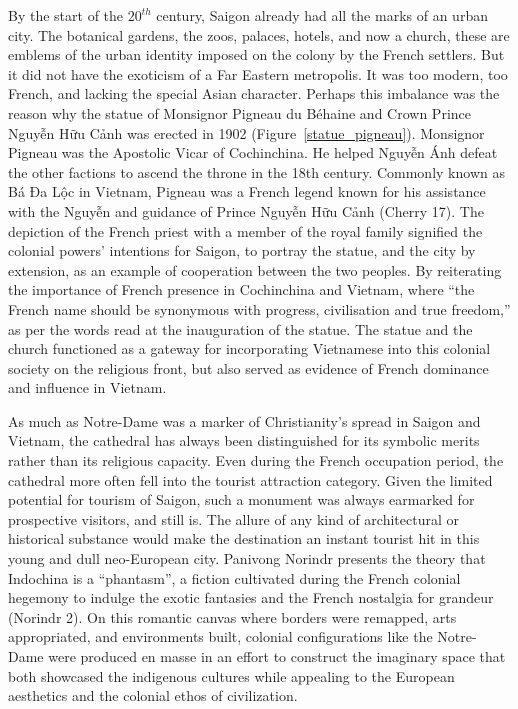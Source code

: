 \vi By the start of the $20^{th}$ century, Saigon already had all the marks of an urban city. The botanical gardens, the zoos, palaces, hotels, and now a church, these are emblems of the urban identity imposed on the colony by the French settlers. But it did not have the exoticism of a Far Eastern metropolis. It was too modern, too French, and lacking the special Asian character. Perhaps this imbalance was the reason why the statue of Monsignor Pigneau du Béhaine and Crown Prince Nguyễn Hữu Cảnh was erected in 1902 (Figure~\ref{statue_pigneau}). Monsignor Pigneau was the Apostolic Vicar of Cochinchina. He helped Nguyễn Ánh defeat the other factions to ascend the throne in the 18th century. Commonly known as Bá Đa Lộc in Vietnam, Pigneau was a French legend known for his assistance with the Nguyễn and guidance of Prince Nguyễn Hữu Cảnh (Cherry 17).  The depiction of the French priest with a member of the royal family signified the colonial powers' intentions for Saigon, to portray the  statue, and the city by extension, as an example of cooperation between the two peoples. By reiterating the importance of French presence in Cochinchina and Vietnam, where “the French name should be synonymous with progress, civilisation and true freedom,” as per the words read at the inauguration of the statue.  The statue and the church functioned as a gateway for incorporating Vietnamese into this colonial society on the religious front, but also served as evidence of French dominance and influence in Vietnam.

As much as Notre-Dame was a marker of Christianity’s spread in Saigon and Vietnam, the cathedral has always been distinguished for its symbolic merits rather than its religious capacity. Even during the French occupation period, the cathedral more often fell into the tourist attraction category.  Given the limited potential for tourism of Saigon, such a monument was always earmarked for prospective visitors, and still is. The allure of any kind of architectural or historical substance would make the destination an instant tourist hit in this young and dull neo-European city. Panivong Norindr presents the theory that Indochina is a “phantasm”, a fiction cultivated during the French colonial hegemony to indulge the exotic fantasies and the French nostalgia for grandeur (Norindr 2). On this romantic canvas where borders were remapped, arts appropriated, and environments built, colonial configurations like the Notre-Dame were produced en masse in an effort to construct the imaginary space that both showcased the indigenous cultures while appealing to the European aesthetics and the colonial ethos of civilization.

